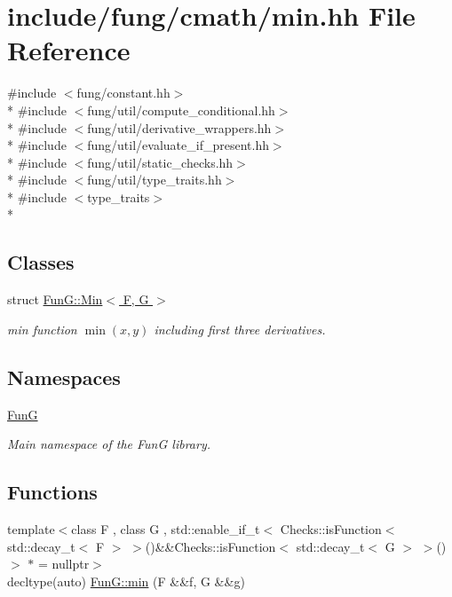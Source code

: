 \hypertarget{min_8hh}{}\section{include/fung/cmath/min.hh File Reference}
\label{min_8hh}
{\ttfamily \#include $<$fung/constant.\+hh$>$}\\*
{\ttfamily \#include $<$fung/util/compute\+\_\+conditional.\+hh$>$}\\*
{\ttfamily \#include $<$fung/util/derivative\+\_\+wrappers.\+hh$>$}\\*
{\ttfamily \#include $<$fung/util/evaluate\+\_\+if\+\_\+present.\+hh$>$}\\*
{\ttfamily \#include $<$fung/util/static\+\_\+checks.\+hh$>$}\\*
{\ttfamily \#include $<$fung/util/type\+\_\+traits.\+hh$>$}\\*
{\ttfamily \#include $<$type\+\_\+traits$>$}\\*
\subsection*{Classes}
\begin{DoxyCompactItemize}
\item 
struct \hyperlink{structFunG_1_1Min}{Fun\+G\+::\+Min$<$ F, G $>$}
\begin{DoxyCompactList}\small\item\em min function $ \min(x,y) $ including first three derivatives. \end{DoxyCompactList}\end{DoxyCompactItemize}
\subsection*{Namespaces}
\begin{DoxyCompactItemize}
\item 
 \hyperlink{namespaceFunG}{FunG}
\begin{DoxyCompactList}\small\item\em Main namespace of the FunG library. \end{DoxyCompactList}\end{DoxyCompactItemize}
\subsection*{Functions}
\begin{DoxyCompactItemize}
\item 
{\footnotesize template$<$class F , class G , std\+::enable\+\_\+if\+\_\+t$<$ Checks\+::is\+Function$<$ std\+::decay\+\_\+t$<$ F $>$ $>$()\&\&\+Checks\+::is\+Function$<$ std\+::decay\+\_\+t$<$ G $>$ $>$() $>$ $\ast$  = nullptr$>$ }\\decltype(auto) \hyperlink{group__CMathGroup_ga3f7e080cc9d1ca2b99cb4d2f41ed557c}{Fun\+G\+::min} (F \&\&f, G \&\&g)
\end{DoxyCompactItemize}
